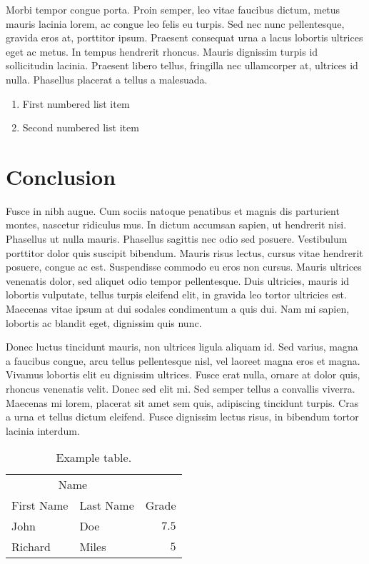 \documentclass[
  UTF8, %
  12pt, %
]{essay}
\begin{document}
Morbi tempor congue porta. Proin semper, leo vitae faucibus dictum, metus mauris lacinia lorem, ac congue leo felis eu turpis. Sed nec nunc pellentesque, gravida eros at, porttitor ipsum. Praesent consequat urna a lacus lobortis ultrices eget ac metus. In tempus hendrerit rhoncus. Mauris dignissim turpis id sollicitudin lacinia. Praesent libero tellus, fringilla nec ullamcorper at, ultrices id nulla. Phasellus placerat a tellus a malesuada.

\begin{enumerate}
  \item First numbered list item
  \item Second numbered list item
\end{enumerate}


\section*{Conclusion}

Fusce in nibh augue. Cum sociis natoque penatibus et magnis dis parturient montes, nascetur ridiculus mus. In dictum accumsan sapien, ut hendrerit nisi. Phasellus ut nulla mauris. Phasellus sagittis nec odio sed posuere. Vestibulum porttitor dolor quis suscipit bibendum. Mauris risus lectus, cursus vitae hendrerit posuere, congue ac est. Suspendisse commodo eu eros non cursus. Mauris ultrices venenatis dolor, sed aliquet odio tempor pellentesque. Duis ultricies, mauris id lobortis vulputate, tellus turpis eleifend elit, in gravida leo tortor ultricies est. Maecenas vitae ipsum at dui sodales condimentum a quis dui. Nam mi sapien, lobortis ac blandit eget, dignissim quis nunc.

Donec luctus tincidunt mauris, non ultrices ligula aliquam id. Sed varius, magna a faucibus congue, arcu tellus pellentesque nisl, vel laoreet magna eros et magna. Vivamus lobortis elit eu dignissim ultrices. Fusce erat nulla, ornare at dolor quis, rhoncus venenatis velit. Donec sed elit mi. Sed semper tellus a convallis viverra. Maecenas mi lorem, placerat sit amet sem quis, adipiscing tincidunt turpis. Cras a urna et tellus dictum eleifend. Fusce dignissim lectus risus, in bibendum tortor lacinia interdum.

\begin{table}[h] %
  \caption{Example table.}
  \centering
  \begin{tabular}{l l r}
    \toprule
    \multicolumn{2}{c}{Name}       \\
    \cmidrule(r){1-2}
    First Name & Last Name & Grade \\
    \midrule
    John       & Doe       & $7.5$ \\
    Richard    & Miles     & $5$   \\
    \bottomrule
  \end{tabular}
\end{table}
\end{document}
